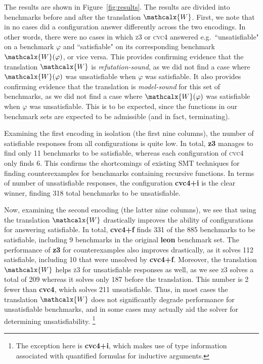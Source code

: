 \documentclass[runningheads,a4paper]{llncs}
\newcommand{\cvc}{\textsc{cvc}{\small 4}\xspace}
\newcommand{\ziii}{\textsc{z}{\small 3}\xspace}
\newcommand{\conv}{\mathcalx{W}}
\begin{document}
The results are shown in Figure~\ref{fig:results}.
The results are divided into benchmarks before and after the translation $\conv$.
First, we note that in no cases did a configuration answer differently across the two encodings.
In other words, there were no cases in which \ziii or \cvc answered e.g.\ ``unsatisfiable" on a benchmark $\varphi$
and ``satisfiable" on its corresponding benchmark $\conv( \varphi )$, or vice versa.
This provides confirming evidence that the translation $\conv$ is \emph{refutation-sound},
as we did not find a case where $\conv( \varphi )$ was unsatisfiable when $\varphi$ was satisfiable.
It also provides confirming evidence that the translation is \emph{model-sound} for this set of benchmarks,
as we did not find a case where $\conv( \varphi )$ was satisfiable when $\varphi$ was unsatisfiable.
This is to be expected, since the functions in our benchmark sets are expected to be admissible (and in fact, terminating).

Examining the first encoding in isolation (the first nine columns),
the number of satisfiable responses from all configurations is quite low.
In total, {\bf z3} manages to find only 11 benchmarks to be satisfiable,
whereas each configuration of \cvc only finds 6.
This confirms the shortcomings of existing SMT techniques for finding counterexamples for benchmarks containing recursive functions.
In terms of number of unsatisfiable responses,
the configuration {\bf cvc4+i} is the clear winner, finding 318 total benchmarks to be unsatisfiable.

Now, examining the second encoding (the latter nine columns), 
we see that using the translation $\conv$ drastically improves the ability of configurations for answering satisfiable.
In total, {\bf cvc4+f} finds 331 of the 885 benchmarks to be satisfiable, including 9 benchmarks in the original {\bf leon} benchmark set.
The performance of {\bf z3} for counterexamples also improves drastically, as it solves 112 satisfiable,
including 10 that were unsolved by {\bf cvc4+f}.
Moreover, the translation $\conv$ helps \ziii for unsatisfiable responses as well,
as we see \ziii solves a total of 209 whereas it solves only 187 before the translation.
This number is 2 fewer than {\bf cvc4}, which solves 211 unsatisfiable.
Thus, in most cases the translation $\conv$ does not significantly degrade performance for unsatisfiable benchmarks,
and in some cases may actually aid the solver for determining unsatisfiability.%
\footnote{The exception here is {\bf cvc4+i}, which makes use of type
information associated with quantified formulas for inductive arguments.}
\end{document}
